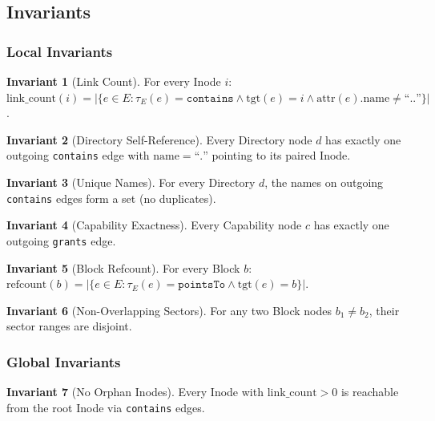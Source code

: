 \documentclass[11pt,a4paper]{article}
\theoremstyle{definition}
\newtheorem{invariant}{Invariant}[section]
\begin{document}
\subsection{Invariants}\label{sec:invariants}

\subsubsection{Local Invariants}

\begin{invariant}[Link Count]\label{inv:linkcount}
For every Inode $i$: $\mathrm{link\_count}(i) = |\{e \in E : \tau_E(e) = \texttt{contains} \land \mathrm{tgt}(e) = i \land \mathrm{attr}(e).\mathrm{name} \ne \text{``..''}\}|$.
\end{invariant}

\begin{invariant}[Directory Self-Reference]\label{inv:selfref}
Every Directory node $d$ has exactly one outgoing \texttt{contains} edge with $\mathrm{name} = \text{``.''}$ pointing to its paired Inode.
\end{invariant}

\begin{invariant}[Unique Names]\label{inv:uniquenames}
For every Directory $d$, the names on outgoing \texttt{contains} edges form a set (no duplicates).
\end{invariant}

\begin{invariant}[Capability Exactness]\label{inv:capexact}
Every Capability node $c$ has exactly one outgoing \texttt{grants} edge.
\end{invariant}

\begin{invariant}[Block Refcount]\label{inv:blockref}
For every Block $b$: $\mathrm{refcount}(b) = |\{e \in E : \tau_E(e) = \texttt{pointsTo} \land \mathrm{tgt}(e) = b\}|$.
\end{invariant}

\begin{invariant}[Non-Overlapping Sectors]\label{inv:sectors}
For any two Block nodes $b_1 \ne b_2$, their sector ranges are disjoint.
\end{invariant}

\subsubsection{Global Invariants}

\begin{invariant}[No Orphan Inodes]\label{inv:noorphan}
Every Inode with $\mathrm{link\_count} > 0$ is reachable from the root Inode via \texttt{contains} edges.
\end{invariant}
\end{document}
